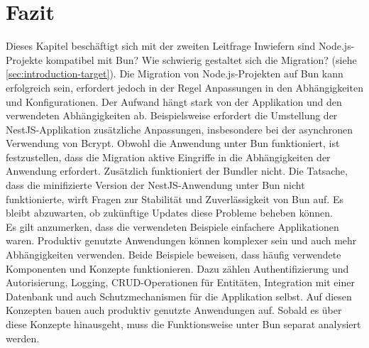 \section{Fazit} \label{sec:compabitility-conclusion}
Dieses Kapitel beschäftigt sich mit der zweiten Leitfrage \glqq Inwiefern sind Node.js-Projekte kompatibel mit Bun? Wie schwierig gestaltet sich die Migration?\grqq{} (siehe \autoref{sec:introduction-target}). Die Migration von Node.js-Projekten auf Bun kann erfolgreich sein, erfordert jedoch in der Regel Anpassungen in den Abhängigkeiten und Konfigurationen. Der Aufwand hängt stark von der Applikation und den verwendeten Abhängigkeiten ab. Beispielsweise erfordert die Umstellung der NestJS-Applikation zusätzliche Anpassungen, insbesondere bei der asynchronen Verwendung von Bcrypt. Obwohl die Anwendung unter Bun funktioniert, ist festzustellen, dass die Migration aktive Eingriffe in die Abhängigkeiten der Anwendung erfordert. Zusätzlich funktioniert der Bundler nicht.  Die Tatsache, dass die minifizierte Version der NestJS-Anwendung unter Bun nicht funktionierte, wirft Fragen zur Stabilität und Zuverlässigkeit von Bun auf. Es bleibt abzuwarten, ob zukünftige Updates diese Probleme beheben können.\\

\noindent
Es gilt anzumerken, dass die verwendeten Beispiele einfachere Applikationen waren. Produktiv genutzte Anwendungen können komplexer sein und auch mehr Abhängigkeiten verwenden. Beide Beispiele beweisen, dass häufig verwendete Komponenten und Konzepte funktionieren. Dazu zählen Authentifizierung und Autorisierung, Logging, CRUD-Operationen für Entitäten, Integration mit einer Datenbank und auch Schutzmechanismen für die Applikation selbst. Auf diesen Konzepten bauen auch produktiv genutzte Anwendungen auf. Sobald es über diese Konzepte hinausgeht, muss die Funktionsweise unter Bun separat analysiert werden.